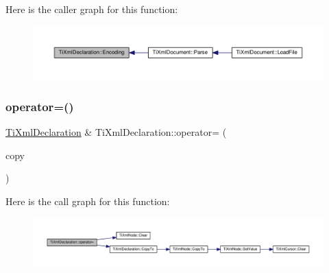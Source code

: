 Here is the caller graph for this function\+:
\nopagebreak
\begin{figure}[H]
\begin{center}
\leavevmode
\includegraphics[width=350pt]{class_ti_xml_declaration_a8d3d1b5b226daa8353276d719497be80_icgraph}
\end{center}
\end{figure}
\mbox{\label{class_ti_xml_declaration_a3bc617efe11014ff2b1a9c5727c37a9a}} 
\subsubsection{\texorpdfstring{operator=()}{operator=()}}
{\footnotesize\ttfamily \hyperlink{class_ti_xml_declaration}{Ti\+Xml\+Declaration} \& Ti\+Xml\+Declaration\+::operator= (\begin{DoxyParamCaption}\item[{const \hyperlink{class_ti_xml_declaration}{Ti\+Xml\+Declaration} \&}]{copy }\end{DoxyParamCaption})}

Here is the call graph for this function\+:
\nopagebreak
\begin{figure}[H]
\begin{center}
\leavevmode
\includegraphics[width=350pt]{class_ti_xml_declaration_a3bc617efe11014ff2b1a9c5727c37a9a_cgraph}
\end{center}
\end{figure}
\mbox{\label{class_ti_xml_declaration_a9839ea97ed687a2b7342fd7b0f04361b}} 
